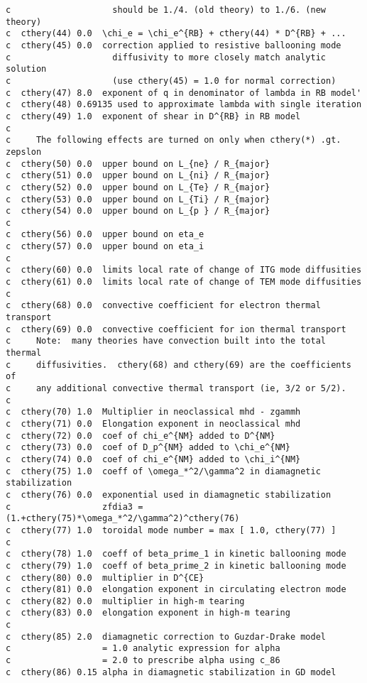 \begin{verbatim}
c                    should be 1./4. (old theory) to 1./6. (new theory)
c  cthery(44) 0.0  \chi_e = \chi_e^{RB} + cthery(44) * D^{RB} + ...
c  cthery(45) 0.0  correction applied to resistive ballooning mode 
c                    diffusivity to more closely match analytic solution
c                    (use cthery(45) = 1.0 for normal correction)
c  cthery(47) 8.0  exponent of q in denominator of lambda in RB model'
c  cthery(48) 0.69135 used to approximate lambda with single iteration
c  cthery(49) 1.0  exponent of shear in D^{RB} in RB model
c
c     The following effects are turned on only when cthery(*) .gt. zepslon
c  cthery(50) 0.0  upper bound on L_{ne} / R_{major}
c  cthery(51) 0.0  upper bound on L_{ni} / R_{major}
c  cthery(52) 0.0  upper bound on L_{Te} / R_{major}
c  cthery(53) 0.0  upper bound on L_{Ti} / R_{major}
c  cthery(54) 0.0  upper bound on L_{p } / R_{major}
c
c  cthery(56) 0.0  upper bound on eta_e
c  cthery(57) 0.0  upper bound on eta_i
c
c  cthery(60) 0.0  limits local rate of change of ITG mode diffusities
c  cthery(61) 0.0  limits local rate of change of TEM mode diffusities
c
c  cthery(68) 0.0  convective coefficient for electron thermal transport
c  cthery(69) 0.0  convective coefficient for ion thermal transport
c     Note:  many theories have convection built into the total thermal
c     diffusivities.  cthery(68) and cthery(69) are the coefficients of
c     any additional convective thermal transport (ie, 3/2 or 5/2).
c
c  cthery(70) 1.0  Multiplier in neoclassical mhd - zgammh
c  cthery(71) 0.0  Elongation exponent in neoclassical mhd
c  cthery(72) 0.0  coef of chi_e^{NM} added to D^{NM}
c  cthery(73) 0.0  coef of D_p^{NM} added to \chi_e^{NM}
c  cthery(74) 0.0  coef of chi_e^{NM} added to \chi_i^{NM}
c  cthery(75) 1.0  coeff of \omega_*^2/\gamma^2 in diamagnetic stabilization
c  cthery(76) 0.0  exponential used in diamagnetic stabilization
c                  zfdia3 = (1.+cthery(75)*\omega_*^2/\gamma^2)^cthery(76)
c  cthery(77) 1.0  toroidal mode number = max [ 1.0, cthery(77) ]
c
c  cthery(78) 1.0  coeff of beta_prime_1 in kinetic ballooning mode
c  cthery(79) 1.0  coeff of beta_prime_2 in kinetic ballooning mode
c  cthery(80) 0.0  multiplier in D^{CE}
c  cthery(81) 0.0  elongation exponent in circulating electron mode
c  cthery(82) 0.0  multiplier in high-m tearing
c  cthery(83) 0.0  elongation exponent in high-m tearing
c
c  cthery(85) 2.0  diamagnetic correction to Guzdar-Drake model
c                  = 1.0 analytic expression for alpha
c                  = 2.0 to prescribe alpha using c_86
c  cthery(86) 0.15 alpha in diamagnetic stabilization in GD model

\end{verbatim}
